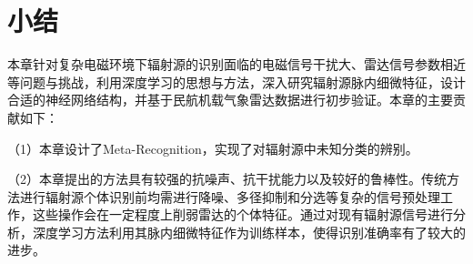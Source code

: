 \section{小结}
\label{sec:sei_summary}
本章针对复杂电磁环境下辐射源的识别面临的电磁信号干扰大、雷达信号参数相近等问题与挑战，利用深度学习的思想与方法，深入研究辐射源脉内细微特征，设计合适的神经网络结构，并基于民航机载气象雷达数据进行初步验证。本章的主要贡献如下：

（1）本章设计了Meta-Recognition，实现了对辐射源中未知分类的辨别。


（2）本章提出的方法具有较强的抗噪声、抗干扰能力以及较好的鲁棒性。传统方法进行辐射源个体识别前均需进行降噪、多径抑制和分选等复杂的信号预处理工作，这些操作会在一定程度上削弱雷达的个体特征。通过对现有辐射源信号进行分析，深度学习方法利用其脉内细微特征作为训练样本，使得识别准确率有了较大的进步。
